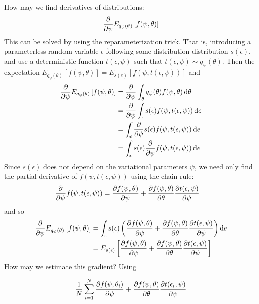 How may we find derivatives of distributions:
\begin{align*}
    \pdv{\psi} E_{q_\psi(\theta)}\left[ f(\psi, \theta) \right]
\end{align*}
This can be solved by using the reparameterization trick. That is, introducing a parameterless random variable $\epsilon$ following some distribution distribution $s(\epsilon)$, and use a deterministic function $t(\epsilon, \psi)$ such that $t(\epsilon, \psi) \sim q_\psi(\theta)$. Then the expectation 
$ E_{q_\psi(\theta)}\left[ f(\psi, \theta) \right] =E_{s(e)}\left[ f(\psi, t(\epsilon, \psi)) \right]$ and 
\begin{align*}
    \pdv{\psi} E_{q_\psi(\theta)}\left[ f(\psi, \theta) \right] 
    &= \pdv{\psi} \int_\theta q_\psi(\theta) f(\psi, \theta)\dd{\theta}\\
    &= \pdv{\psi} \int_\epsilon s(\epsilon) f(\psi, t(\epsilon, \psi))\dd{e}\\
    &= \int_\epsilon \pdv{\psi} s(\epsilon) f(\psi, t(\epsilon, \psi))\dd{e}\\
    &= \int_\epsilon s(\epsilon) \pdv{\psi} f(\psi, t(\epsilon, \psi)) \dd{e}
\end{align*}
Since $s(\epsilon)$ does not depend on the variational parameters $\psi$, we need only find the partial derivative of $f(\psi, t(\epsilon, \psi))$ using the chain rule:
\begin{align*}
    \pdv{\psi} f(\psi, t(\epsilon, \psi)) 
    &= \pdv{f(\psi, \theta)}{\psi}
    + \pdv{f(\psi, \theta)}{\theta}\pdv{t(\epsilon, \psi)}{\psi} 
\end{align*}
and so 
\begin{align*}
    \pdv{\psi} E_{q_\psi(\theta)}\left[ f(\psi, \theta) \right] 
    &= \int_\epsilon s(\epsilon) \left(\pdv{f(\psi, \theta)}{\psi}
    + \pdv{f(\psi, \theta)}{\theta}\pdv{t(\epsilon, \psi)}{\psi} \right) \dd{e} \\
    &= E_{s(\epsilon)} \left[\pdv{f(\psi, \theta)}{\psi} 
    + \pdv{f(\psi, \theta)}{\theta}\pdv{t(\epsilon, \psi)}{\psi} \right]
\end{align*}
How may we estimate this gradient?  Using 

\begin{align*}
    \frac{1}{N} \sum_{i=1}^N \pdv{f(\psi, \theta_i)}{\psi} 
    + \pdv{f(\psi, \theta)}{\theta}\pdv{t(\epsilon_i, \psi)}{\psi} 
\end{align*}
    







